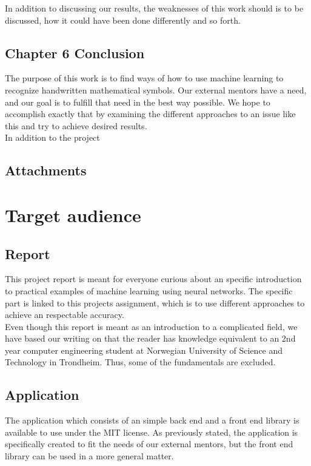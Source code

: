 % 
In addition to discussing our results, the weaknesses of this work should is to be discussed, how it could have been done differently and so forth. 

\subsection{Chapter 6 Conclusion}
The purpose of this work is to find ways of how to use machine learning to recognize handwritten mathematical symbols. Our external mentors have a need, and our goal is to fulfill that need in the best way possible. We hope to accomplish exactly that by examining the different approaches to an issue like this and try to achieve desired results.\\
In addition to the project 

\subsection{Attachments}

\section{Target audience}


\subsection{Report} %
This project report is meant for everyone curious about an specific introduction to practical examples of machine learning using neural networks. The specific part is linked to this projects assignment, which is to use different approaches to achieve an respectable accuracy.\\
Even though this report is meant as an introduction to a complicated field, we have based our writing on that the reader has knowledge equivalent to an 2nd year computer engineering student at Norwegian University of Science and Technology in Trondheim. Thus, some of the fundamentals are excluded. %


\subsection{Application}
The application which consists of an simple back end and a front end library is available to use under the MIT license. As previously stated, the application is specifically created to fit the needs of our external mentors, but the front end library can be used in a more general matter. %



